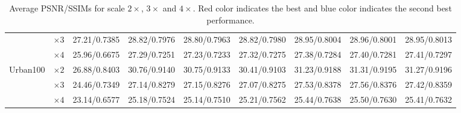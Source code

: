 \documentclass[10pt,twocolumn,letterpaper]{article}
\begin{document}
\begin{table*}[htp]
\begin{center}
\begin{tabular}{|c|c|c|c|c|c|c|c||c|}
			& $\times 3$ & 27.21/0.7385 & 28.82/0.7976 & 28.80/0.7963 & 28.82/0.7980 & \textcolor[rgb]{0.00,0.07,1.00}{28.95}/\textcolor[rgb]{0.00,0.07,1.00}{0.8004} & \textcolor[rgb]{1.00,0.00,0.00}{28.96}/0.8001 & \textcolor[rgb]{0.00,0.07,1.00}{28.95}/\textcolor[rgb]{1.00,0.00,0.00}{0.8013} \\
			
			& $\times 4$ & 25.96/0.6675 & 27.29/0.7251 & 27.23/0.7233 & 27.32/0.7275 & 27.38/\textcolor[rgb]{0.00,0.07,1.00}{0.7284} & \textcolor[rgb]{0.00,0.07,1.00}{27.40}/0.7281 & \textcolor[rgb]{1.00,0.00,0.00}{27.41}/\textcolor[rgb]{1.00,0.00,0.00}{0.7297} \\
			
			\hline
			\hline
			
			\multirow{3}{*}{Urban100} & $\times 2$ & 26.88/0.8403 & 30.76/0.9140 & 30.75/0.9133 & 30.41/0.9103 & 31.23/0.9188 & \textcolor[rgb]{1.00,0.00,0.00}{31.31}/\textcolor[rgb]{0.00,0.07,1.00}{0.9195} & \textcolor[rgb]{0.00,0.07,1.00}{31.27}/\textcolor[rgb]{1.00,0.00,0.00}{0.9196} \\
			
			& $\times 3$ & 24.46/0.7349 & 27.14/0.8279 & 27.15/0.8276 & 27.07/0.8275 & \textcolor[rgb]{0.00,0.07,1.00}{27.53}/\textcolor[rgb]{1.00,0.00,0.00}{0.8378} & \textcolor[rgb]{1.00,0.00,0.00}{27.56}/\textcolor[rgb]{0.00,0.07,1.00}{0.8376} & 27.42/0.8359 \\
			
			& $\times 4$ & 23.14/0.6577 & 25.18/0.7524 & 25.14/0.7510 & 25.21/0.7562 & \textcolor[rgb]{0.00,0.07,1.00}{25.44}/\textcolor[rgb]{1.00,0.00,0.00}{0.7638} & \textcolor[rgb]{1.00,0.00,0.00}{25.50}/0.7630 & 25.41/\textcolor[rgb]{0.00,0.07,1.00}{0.7632} \\
			
			\hline
			
		\end{tabular}
	\end{center}
	\caption{Average PSNR/SSIMs for scale $2 \times$, $3 \times$ and $4 \times$. Red color indicates the best and blue color indicates the second best performance.}
	\label{tab:psnr/ssim}
\end{table*}
\end{document}
